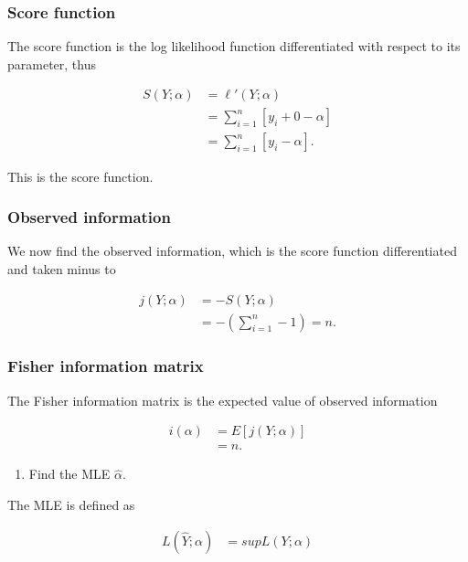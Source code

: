 \subsubsection{Score function}

The score function is the log likelihood function differentiated with respect to its parameter, thus

\begin{align*}
    S\left( Y; \alpha \right) &= \ell'(Y; \alpha)\\
    &= \sum_{i=1}^n \left[ y_i + 0 - \alpha \right]\\
    &= \sum_{i=1}^n \left[ y_i - \alpha \right].
\end{align*}

This is the score function. 

\subsubsection{Observed information}

We now find the observed information, which is the score function differentiated and taken minus to

\begin{align*}
    j\left( Y; \alpha \right) &= - S\left(Y; \alpha \right)\\
    &=  - \left( \sum_{i = 1}^n -1\right) = n.
\end{align*}

\subsubsection{Fisher information matrix}

The Fisher information matrix is the expected value of observed information

\begin{align*}
    i\left(\alpha \right) &= E\left[j(Y;\alpha)\right]\\
    &= n.
\end{align*}

\begin{enumerate}[resume]
    \item  Find the MLE $\hat{\alpha}$.
\end{enumerate}

The MLE is defined as

\begin{align*}
    L(\hat{Y}; \alpha) &= sup L(Y; \alpha)
\end{align*}

